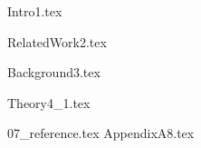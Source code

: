 \documentclass{ctuthesis}
\begin{document}
\maketitle


{Intro1.tex}

{RelatedWork2.tex}

{Background3.tex}


{Theory4_1.tex}









{07_reference.tex}
{AppendixA8.tex}
\end{document}
